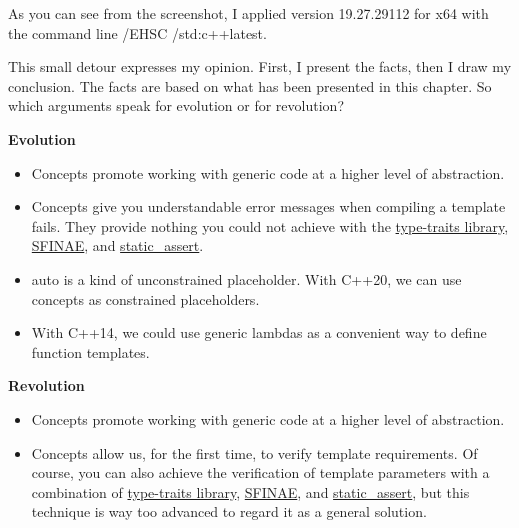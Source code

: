 As you can see from the screenshot, I applied version 19.27.29112 for x64 with the command line /EHSC /std:c++latest.

\begin{tcolorbox}[colback=blue!5!white,colframe=blue!75!black,title=Regular Types]

This small detour expresses my opinion. First, I present the facts, then I draw my conclusion. The facts are based on what has been presented in this chapter. So which arguments speak for evolution or for revolution?

\noindent
\textbf{Evolution}

\begin{itemize}
\item 
Concepts promote working with generic code at a higher level of abstraction.

\item 
Concepts give you understandable error messages when compiling a template fails. They provide nothing you could not achieve with the \href{https://en.cppreference.com/w/cpp/header/type_traits}{type-traits library}, \href{https://en.cppreference.com/w/cpp/language/sfinae}{SFINAE}, and \href{https://en.cppreference.com/w/cpp/language/static_assert}{static\_assert}.

\item 
auto is a kind of unconstrained placeholder. With C++20, we can use concepts as constrained placeholders.

\item 
With C++14, we could use generic lambdas as a convenient way to define function templates.
\end{itemize}

\noindent
\textbf{Revolution}

\begin{itemize}
\item 
Concepts promote working with generic code at a higher level of abstraction.

\item 
Concepts allow us, for the first time, to verify template requirements. Of course, you can also achieve the verification of template parameters with a combination of \href{https://en.cppreference.com/w/cpp/header/type_traits}{type-traits library}, \href{https://en.cppreference.com/w/cpp/language/sfinae}{SFINAE}, and \href{https://en.cppreference.com/w/cpp/language/static_assert}{static\_assert}, but this technique is way too advanced to regard it as a general solution.


\end{itemize}
\end{tcolorbox}
